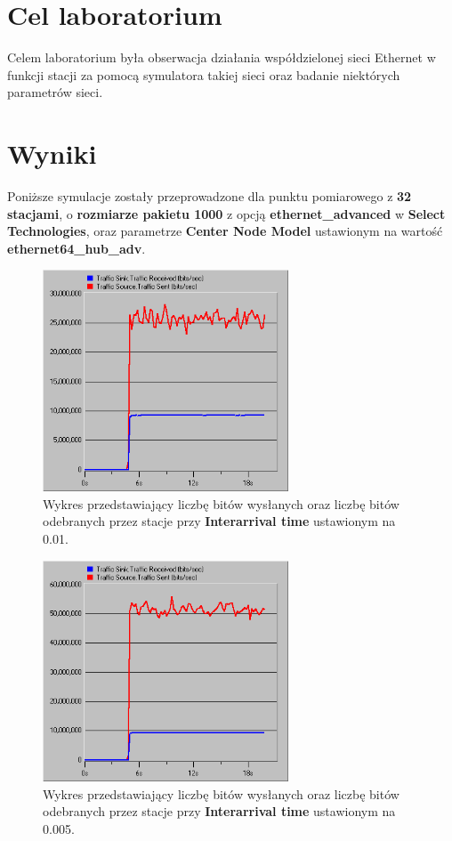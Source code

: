 \documentclass{article}
\begin{document}

\newpage
\section{Cel laboratorium}
Celem laboratorium była obserwacja działania współdzielonej sieci Ethernet w funkcji stacji za pomocą symulatora takiej sieci oraz badanie niektórych parametrów sieci.
\section{Wyniki}
Poniższe symulacje zostały przeprowadzone dla punktu pomiarowego z \textbf{32 stacjami}, o \textbf{rozmiarze pakietu 1000} z opcją \textbf{ethernet\_advanced} w \textbf{Select Technologies}, oraz parametrze \textbf{Center Node Model} ustawionym na wartość \textbf{ethernet64\_hub\_adv}.
\begin{figure}[H]
  \centering
  \includegraphics[width=0.65\textwidth]{screens/samo/001_sentrec.png}
 \caption{Wykres przedstawiający liczbę bitów wysłanych oraz liczbę bitów odebranych przez stacje przy \textbf{Interarrival time} ustawionym na 0.01. }
 \label{fig:sentrec001}
\end{figure}
 
\begin{figure}[H]
  \centering
  \includegraphics[width=0.65\textwidth]{screens/samo/0005_sentrec.png}
 \caption{Wykres przedstawiający liczbę bitów wysłanych oraz liczbę bitów odebranych przez stacje przy \textbf{Interarrival time} ustawionym na 0.005. }
 \label{fig:sentrec005}
\end{figure}
\end{document}
